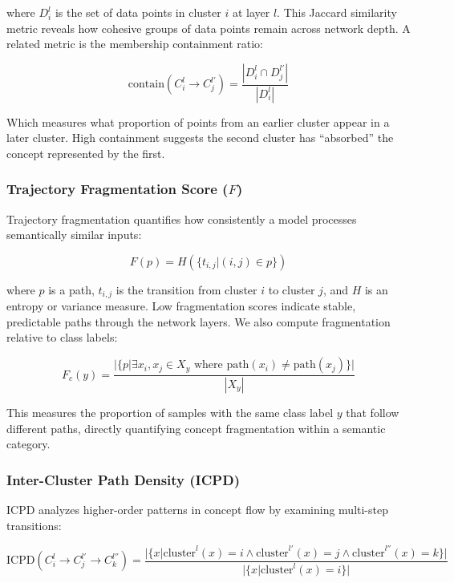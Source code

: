 where $D_i^l$ is the set of data points in cluster $i$ at layer $l$. This Jaccard similarity metric reveals how cohesive groups of data points remain across network depth. A related metric is the membership containment ratio:

\begin{equation}
\text{contain}(C_i^l \rightarrow C_j^{l'}) = \frac{|D_i^l \cap D_j^{l'}|}{|D_i^l|}
\end{equation}

Which measures what proportion of points from an earlier cluster appear in a later cluster. High containment suggests the second cluster has ``absorbed'' the concept represented by the first.

\subsubsection{Trajectory Fragmentation Score ($F$)}

Trajectory fragmentation quantifies how consistently a model processes semantically similar inputs:

\begin{equation}
F(p) = H(\{t_{i,j} | (i,j) \in p\})
\end{equation}

where $p$ is a path, $t_{i,j}$ is the transition from cluster $i$ to cluster $j$, and $H$ is an entropy or variance measure. Low fragmentation scores indicate stable, predictable paths through the network layers. We also compute fragmentation relative to class labels:

\begin{equation}
F_c(y) = \frac{|\{p | \exists x_i, x_j \in X_y \text{ where } \text{path}(x_i) \neq \text{path}(x_j)\}|}{|X_y|}
\end{equation}

This measures the proportion of samples with the same class label $y$ that follow different paths, directly quantifying concept fragmentation within a semantic category.

\subsubsection{Inter-Cluster Path Density (ICPD)}

ICPD analyzes higher-order patterns in concept flow by examining multi-step transitions:

\begin{equation}
\text{ICPD}(C_i^l \rightarrow C_j^{l'} \rightarrow C_k^{l''}) = \frac{|\{x | \text{cluster}^l(x) = i \wedge \text{cluster}^{l'}(x) = j \wedge \text{cluster}^{l''}(x) = k\}|}{|\{x | \text{cluster}^l(x) = i\}|}
\end{equation}

